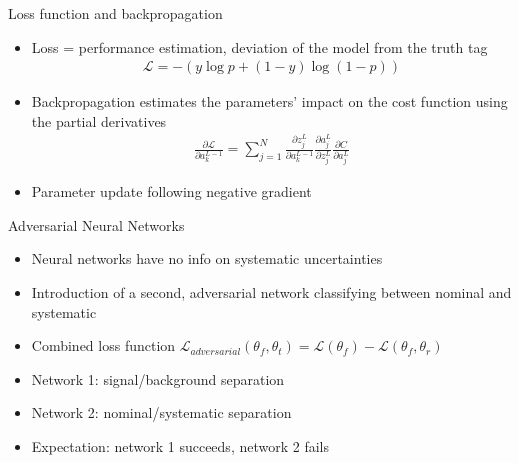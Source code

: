 \documentclass[12pt]{beamer}
\begin{document}
\begin{frame}{Loss function and backpropagation}
    \begin{itemize}
        \item Loss = performance estimation, deviation of the model from the truth tag
        \begin{align*}
            \mathcal{L} = -(y \log p + (1 - y) \log (1 - p) )
            \label{eq:binary_crossentropy}
        \end{align*}
        \item Backpropagation estimates the parameters' impact on the cost function using the partial derivatives
        \begin{align*}
            \frac{\partial \mathcal{L}}{\partial a_k^{L-1}} = \sum_{j=1}^N \frac{\partial z_j^L}{\partial a_k^{L-1}} \frac{\partial a_j^L}{\partial z_j^L}\frac{\partial C}{\partial a_j^L}
        \end{align*}
        \item Parameter update following negative gradient
    \end{itemize}
\end{frame}


\begin{frame}{Adversarial Neural Networks}
    \begin{itemize}
        \item Neural networks have no info on systematic uncertainties 
        \vspace{0.2cm}
        \item Introduction of a second, adversarial network classifying between nominal and systematic
        \vspace{0.2cm}
        \item Combined loss function $\mathcal{L}_{adversarial}\left( \theta_f, \theta_t \right) = \mathcal{L}(\theta_f) - \mathcal{L}(\theta_f, \theta_r)$
        \vspace{0.2cm}
        \item Network 1: signal/background separation
        \vspace{0.2cm}
        \item Network 2: nominal/systematic separation
        \vspace{0.2cm}
        \item Expectation: network 1 succeeds, network 2 fails
    \end{itemize}
\end{frame}
\end{document}
